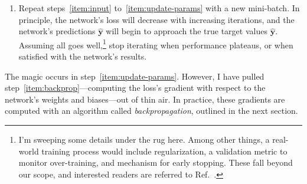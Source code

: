 \documentclass[11pt, a4paper]{article}
\renewcommand{\vec}[1]{\bm{#1}}
\newcommand{\y}{\vec{y}}
\begin{document}
\begin{enumerate}
    \item Repeat steps~\ref{item:input} to~\ref{item:update-params} with a new mini-batch.
    In principle, the network's loss will decrease with increasing iterations, and the network's predictions $ \hat{\y} $ will begin to approach the true target values $ \hat{\y} $.
    Assuming all goes well,\footnote{I'm sweeping some details under the rug here.
    Among other things, a real-world training process would include regularization, a validation metric to monitor over-training, and mechanism for early stopping.
    These fall beyond our scope, and interested readers are referred to Ref.~\cite{homl}.} stop iterating when performance plateaus, or when satisfied with the network's results.

\end{enumerate}
The magic occurs in step~\ref{item:update-params}.
However, I have pulled step~\ref{item:backprop}---computing the loss's gradient with respect to the network's weights and biases---out of thin air.
In practice, these gradients are computed with an algorithm called \textit{backpropagation}, outlined in the next section.
\end{document}
